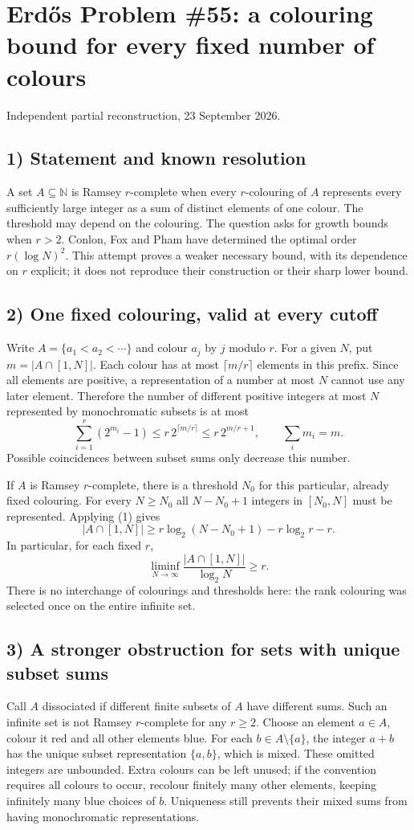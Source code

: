 \section{Erd\H{o}s Problem \#55: a colouring bound for every fixed number of colours}
\noindent Independent partial reconstruction, 23 September 2026.

\subsection*{1) Statement and known resolution}
A set $A\subseteq\mathbb N$ is Ramsey $r$-complete when every $r$-colouring of $A$ represents every sufficiently large integer as a sum of distinct elements of one colour. The threshold may depend on the colouring. The question asks for growth bounds when $r>2$. Conlon, Fox and Pham have determined the optimal order $r(\log N)^2$. This attempt proves a weaker necessary bound, with its dependence on $r$ explicit; it does not reproduce their construction or their sharp lower bound.

\subsection*{2) One fixed colouring, valid at every cutoff}
Write $A=\{a_1<a_2<\cdots\}$ and colour $a_j$ by $j$ modulo $r$. For a given $N$, put $m=|A\cap[1,N]|$. Each colour has at most $\lceil m/r\rceil$ elements in this prefix. Since all elements are positive, a representation of a number at most $N$ cannot use any later element. Therefore the number of different positive integers at most $N$ represented by monochromatic subsets is at most
\[
 \sum_{i=1}^r(2^{m_i}-1)\le r\,2^{\lceil m/r\rceil}\le r\,2^{m/r+1},
 \qquad \sum_i m_i=m.\tag{1}
\]
Possible coincidences between subset sums only decrease this number.

If $A$ is Ramsey $r$-complete, there is a threshold $N_0$ for this particular, already fixed colouring. For every $N\ge N_0$ all $N-N_0+1$ integers in $[N_0,N]$ must be represented. Applying (1) gives
\[
 |A\cap[1,N]|\ge r\log_2(N-N_0+1)-r\log_2r-r.\tag{2}
\]
In particular, for each fixed $r$,
\[
 \liminf_{N\to\infty}\frac{|A\cap[1,N]|}{\log_2N}\ge r.
\]
There is no interchange of colourings and thresholds here: the rank colouring was selected once on the entire infinite set.

\subsection*{3) A stronger obstruction for sets with unique subset sums}
Call $A$ dissociated if different finite subsets of $A$ have different sums. Such an infinite set is not Ramsey $r$-complete for any $r\ge2$. Choose an element $a\in A$, colour it red and all other elements blue. For each $b\in A\setminus\{a\}$, the integer $a+b$ has the unique subset representation $\{a,b\}$, which is mixed. These omitted integers are unbounded. Extra colours can be left unused; if the convention requires all colours to occur, recolour finitely many other elements, keeping infinitely many blue choices of $b$. Uniqueness still prevents their mixed sums from having monochromatic representations.

